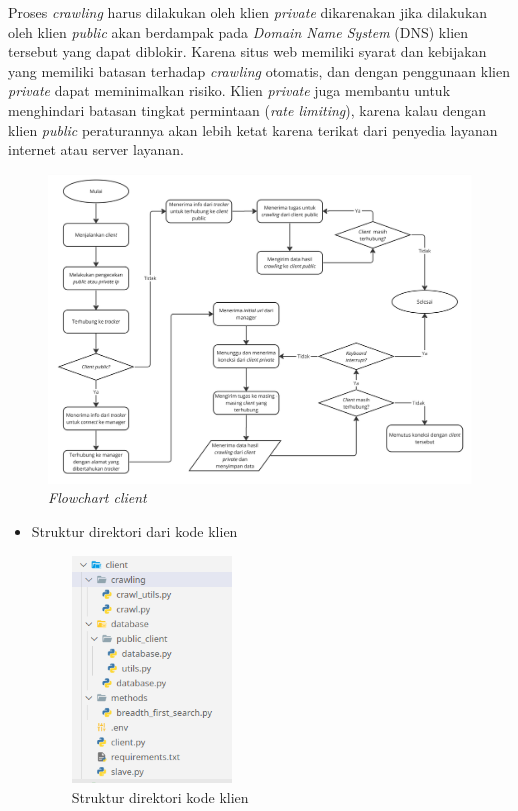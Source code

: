 Proses \emph{crawling} harus dilakukan oleh klien \emph{private} dikarenakan jika dilakukan oleh klien \emph{public} akan berdampak pada \emph{Domain Name System} (DNS) klien tersebut yang dapat diblokir. Karena situs web memiliki syarat dan kebijakan yang memiliki batasan terhadap \emph{crawling} otomatis, dan dengan penggunaan klien \emph{private} dapat meminimalkan risiko. Klien \emph{private} juga membantu untuk menghindari batasan tingkat permintaan (\emph{rate limiting}), karena kalau dengan klien \emph{public} peraturannya akan lebih ketat karena terikat dari penyedia layanan internet atau server layanan.

\begin{figure}[H]
	\centering{}
	\includegraphics[width=1\textwidth]{gambar/flowchart_client}
	\caption{\emph{Flowchart client} }
\end{figure}
\clearpage

\begin{itemize}
	\item{Struktur direktori dari kode klien}
	\begin{figure}[H]
		\centering{}
		\includegraphics[width=0.4\textwidth]{gambar/kode/potongan_client_01}
		\caption{Struktur direktori kode klien}
	\end{figure}
\end{itemize}

